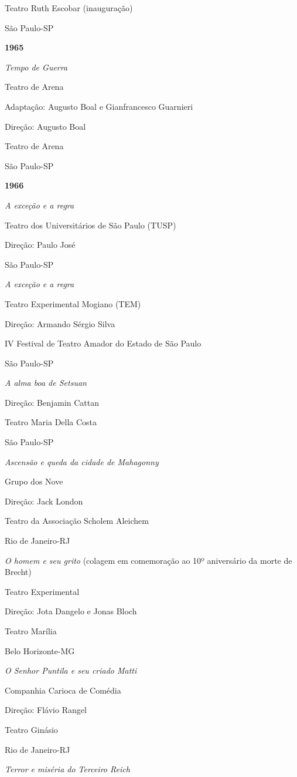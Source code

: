 Teatro Ruth Escobar (inauguração)

São Paulo-SP

\textbf{1965}

\textit{Tempo de Guerra}

Teatro de Arena

Adaptação: Augusto Boal e Gianfrancesco Guarnieri

Direção: Augusto Boal

Teatro de Arena

São Paulo-SP

\textbf{1966}

\textit{A exceção e a regra}

Teatro dos Universitários de São Paulo (TUSP)

Direção: Paulo José

São Paulo-SP

\textit{A exceção e a regra}

Teatro Experimental Mogiano (TEM)

Direção: Armando Sérgio Silva

IV Festival de Teatro Amador do Estado de São Paulo

São Paulo-SP

\textit{A alma boa de Setsuan}

Direção: Benjamin Cattan

Teatro Maria Della Costa

São Paulo-SP

\textit{Ascensão e queda da cidade de Mahagonny}

Grupo dos Nove

Direção: Jack London

Teatro da Associação Scholem Aleichem

Rio de Janeiro-RJ

\textit{O homem e seu grito} (colagem em comemoração ao 10º aniversário da
morte de Brecht)

Teatro Experimental

Direção: Jota Dangelo e Jonas Bloch

Teatro Marília

Belo Horizonte-MG

\textit{O Senhor Puntila e seu criado Matti}

Companhia Carioca de Comédia

Direção: Flávio Rangel

Teatro Ginásio

Rio de Janeiro-RJ

\textit{Terror e miséria do Terceiro Reich}

